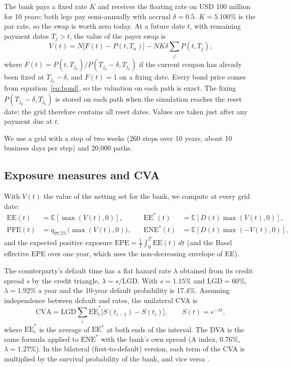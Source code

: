 \documentclass[11pt,a4paper]{article}
\begin{document}
The bank pays a fixed rate $K$ and receives the floating rate on USD 100 million for 10 years; both legs pay semi-annually with accrual $\delta=0.5$. $K = 5.100\%$ is the par rate, so the swap is worth zero today. At a future date $t$, with remaining payment dates $T_j > t$, the value of the payer swap is
\begin{equation}
V(t) = N\Big[F(t) - P(t,T_n)\Big] - N K \delta \sum_{j} P(t,T_j),
\end{equation}
where $F(t) = P(t,T_{j_0})/P(T_{j_0}-\delta,T_{j_0})$ if the current coupon has already been fixed at $T_{j_0}-\delta$, and $F(t)=1$ on a fixing date. Every bond price comes from equation~\eqref{eq:bond}, so the valuation on each path is exact. The fixing $P(T_{j_0}-\delta, T_{j_0})$ is stored on each path when the simulation reaches the reset date; the grid therefore contains all reset dates. Values are taken just after any payment due at $t$.

We use a grid with a step of two weeks (260 steps over 10 years, about 10 business days per step) and 20{,}000 paths.

\subsection{Exposure measures and CVA}

With $V(t)$ the value of the netting set for the bank, we compute at every grid date:
\begin{align*}
\text{EE}(t) &= \mathbb{E}[\max(V(t),0)], &\quad \text{EE}^*(t) &= \mathbb{E}[D(t)\max(V(t),0)], \\
\text{PFE}(t) &= q_{97.5\%}\big(\max(V(t),0)\big), &\quad \text{ENE}^*(t) &= \mathbb{E}[D(t)\max(-V(t),0)],
\end{align*}
and the expected positive exposure $\text{EPE} = \frac{1}{T}\int_0^T \text{EE}(t)\,dt$ (and the Basel effective EPE over one year, which uses the non-decreasing envelope of EE).

The counterparty's default time has a flat hazard rate $\lambda$ obtained from its credit spread $s$ by the credit triangle, $\lambda = s/\text{LGD}$. With $s=1.15\%$ and $\text{LGD}=60\%$, $\lambda = 1.92\%$ a year and the 10-year default probability is 17.4\%. Assuming independence between default and rates, the unilateral CVA is
\begin{equation}
\text{CVA} = \text{LGD} \sum_{i} \overline{\text{EE}}^*_i \big[S(t_{i-1}) - S(t_i)\big], \qquad S(t) = e^{-\lambda t},
\end{equation}
where $\overline{\text{EE}}^*_i$ is the average of $\text{EE}^*$ at both ends of the interval. The DVA is the same formula applied to $\text{ENE}^*$ with the bank's own spread (A index, 0.76\%, $\lambda=1.27\%$). In the bilateral (first-to-default) version, each term of the CVA is multiplied by the survival probability of the bank, and vice versa \citep{brigo2013}.
\end{document}
